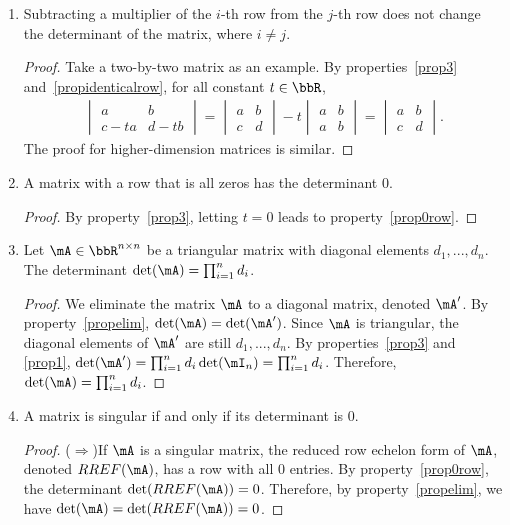 \documentclass[11pt]{article}
\theoremstyle{plain}
\theoremstyle{definition}
\begin{document}
\begin{enumerate}
	\item \label{propelim} Subtracting a multiplier of the $i$-th row from the $j$-th row does not change the determinant of the matrix, where $i \neq j$.
	\begin{proof}
		Take a two-by-two matrix as an example. By properties~\ref{prop3} and~\ref{propidenticalrow}, for all constant $t \in \bbR$,
	\begin{align}
		 \begin{vmatrix}
			a & b \\ c - ta&d -tb
		\end{vmatrix} = \begin{vmatrix}
			a & b \\ c &d
		\end{vmatrix} -t \begin{vmatrix}
			a & b \\ a& b
		\end{vmatrix}  = \begin{vmatrix}
			a & b \\ c &d
		\end{vmatrix}.
	\end{align}
	The proof for higher-dimension matrices is similar.
	\end{proof}
	
	\item\label{prop0row} A matrix with a row that is all zeros has the determinant 0.
	\begin{proof}
		By property~\ref{prop3}, letting $t = 0$ leads to property~\ref{prop0row}.
	\end{proof}

	
	\item\label{propdiag} Let $\mA \in \bbR^{n \times n}$ be a triangular matrix with diagonal elements $d_1,...,d_n$. The determinant $\det(\mA) = \prod_{i = 1}^n d_i$. 
	\begin{proof}
	We eliminate the matrix $\mA$ to a diagonal matrix, denoted $\mA'$. By property~\ref{propelim}, $\det(\mA) = \det(\mA')$. Since $\mA$ is triangular, the diagonal elements of $\mA'$ are still $d_1,...,d_n$.
 		 By properties~\ref{prop3} and \ref{prop1}, $\det(\mA') = \prod_{i = 1}^n d_i\det(\mI_n) =\prod_{i = 1}^n d_i$. Therefore, $\det(\mA) = \prod_{i = 1}^n d_i$.
	\end{proof}

	
	\item\label{propsingular} A matrix is singular if and only if its determinant is  0.
	
	\begin{proof}
		($\Rightarrow$)If $\mA$ is a singular matrix, the reduced row echelon form of $\mA$, denoted $RREF(\mA)$, has a row with all 0 entries. By property~\ref{prop0row}, the determinant $\det(RREF(\mA)) = 0$. Therefore, by property~\ref{propelim}, we have $\det(\mA) =\det(RREF(\mA)) =  0$. 
		

\end{proof}
\end{enumerate}
\end{document}
